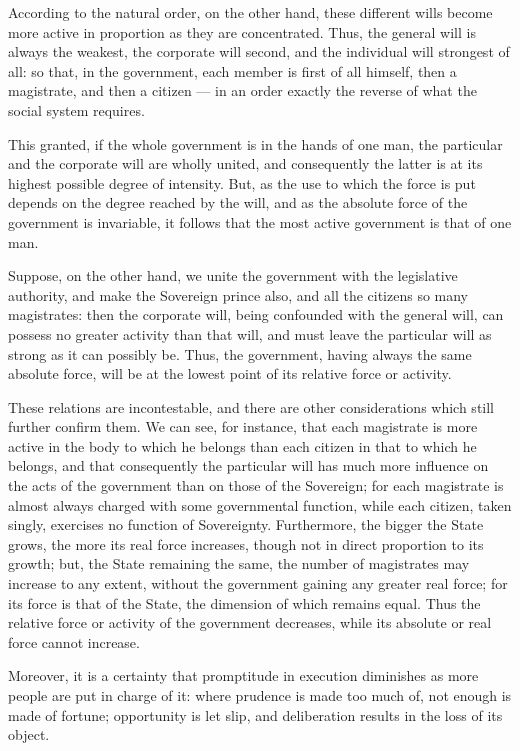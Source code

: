 \documentclass[12pt]{book}
\begin{document}
According to the natural order, on the other hand, these different wills become more active in proportion as they are concentrated. Thus, the general will is always the weakest, the corporate will second, and the individual will strongest of all: so that, in the government, each member is first of all himself, then a magistrate, and then a citizen — in an order exactly the reverse of what the social system requires.

This granted, if the whole government is in the hands of one man, the particular and the corporate will are wholly united, and consequently the latter is at its highest possible degree of intensity. But, as the use to which the force is put depends on the degree reached by the will, and as the absolute force of the government is invariable, it follows that the most active government is that of one man.

Suppose, on the other hand, we unite the government with the legislative authority, and make the Sovereign prince also, and all the citizens so many magistrates: then the corporate will, being confounded with the general will, can possess no greater activity than that will, and must leave the particular will as strong as it can possibly be. Thus, the government, having always the same absolute force, will be at the lowest point of its relative force or activity.

These relations are incontestable, and there are other considerations which still further confirm them. We can see, for instance, that each magistrate is more active in the body to which he belongs than each citizen in that to which he belongs, and that consequently the particular will has much more influence on the acts of the government than on those of the Sovereign; for each magistrate is almost always charged with some governmental function, while each citizen, taken singly, exercises no function of Sovereignty. Furthermore, the bigger the State grows, the more its real force increases, though not in direct proportion to its growth; but, the State remaining the same, the number of magistrates may increase to any extent, without the government gaining any greater real force; for its force is that of the State, the dimension of which remains equal. Thus the relative force or activity of the government decreases, while its absolute or real force cannot increase.

Moreover, it is a certainty that promptitude in execution diminishes as more people are put in charge of it: where prudence is made too much of, not enough is made of fortune; opportunity is let slip, and deliberation results in the loss of its object.
\end{document}
